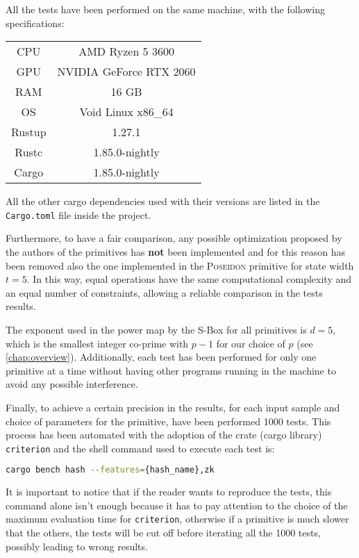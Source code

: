 \documentclass[12pt, a4paper]{report}
\begin{document}
All the tests have been performed on the same machine, with the following specifications:
\begin{table}[H]
    \centering
    \begin{tabular}{|c||c|}
      \hline
        CPU & AMD Ryzen 5 3600 \\
        GPU & NVIDIA GeForce RTX 2060 \\
        RAM & 16 GB \\
        OS & Void Linux x86\_64 \\
        \hline
        Rustup & 1.27.1 \\
        Rustc & 1.85.0-nightly \\
        Cargo & 1.85.0-nightly \\
      \hline
    \end{tabular}
    \label{tab:machinespecs}
\end{table}
All the other cargo dependencies used with their versions are listed in the \texttt{Cargo.toml} file inside the project.

Furthermore, to have a fair comparison, any possible optimization proposed by the authors of the primitives has \textbf{not} been implemented and for this reason has been removed also the one implemented in the \textsc{Poseidon} primitive for state width $t = 5$.
In this way, equal operations have the same computational complexity and an equal number of constraints, allowing a reliable comparison in the tests results.

The exponent used in the power map by the S-Box for all primitives is $d = 5$, which is the smallest integer co-prime with $p-1$ for our choice of $p$ (see \autoref{chap:overview}).
Additionally, each test has been performed for only one primitive at a time without having other programs running in the machine to avoid any possible interference.

Finally, to achieve a certain precision in the results, for each input sample and choice of parameters for the primitive, have been performed 1000 tests.
This process has been automated with the adoption of the crate (cargo library) \texttt{criterion} and the shell command used to execute each test is:
\begin{lstlisting}[language=bash]
  cargo bench hash --features={hash_name},zk
\end{lstlisting}
It is important to notice that if the reader wants to reproduce the tests, this command alone isn't enough because it has to pay attention to the choice of the maximum evaluation time for \texttt{criterion}, otherwise if a primitive is much slower that the others, the tests will be cut off before iterating all the 1000 tests, possibly leading to wrong results.
\end{document}
